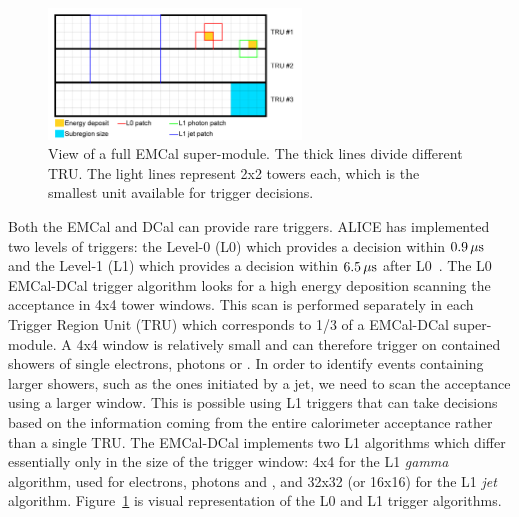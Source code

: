 \documentclass[12pt, a4paper, twoside, titlepage]{article}
\begin{document}
\begin{figure}[tb]
\begin{center}
\includegraphics[width=0.6\textwidth]{img/emcaltrigger}
 \caption{View of a full EMCal super-module. The thick lines divide different TRU. The light lines represent 2x2 towers each, which is the smallest unit
available for trigger decisions.} 
 \label{fig:emcaltrigger}
\end{center}
\end{figure}
Both the EMCal and DCal can provide rare triggers. ALICE has implemented two levels of triggers: the Level-0 (L0) which provides a decision within 
$0.9\,\rm \mu s$ and the Level-1 (L1) which provides a decision within $6.5\,\rm \mu s$ after L0~\cite{ALICE:2014b}. The L0 EMCal-DCal trigger algorithm looks for a high energy
deposition scanning the acceptance in 4x4 tower windows. This scan is performed separately in each Trigger Region Unit (TRU) which corresponds to 1/3 of a EMCal-DCal super-module.
A 4x4 window is relatively small and can therefore trigger on contained showers of single electrons, photons or \pizero.
In order to identify events containing larger showers, such as the ones initiated by a jet, we need to scan the acceptance using a larger window. This is possible using
L1 triggers that can take decisions based on the information coming from the entire calorimeter acceptance rather than a single TRU. The EMCal-DCal implements two L1 algorithms
which differ essentially only in the size of the trigger window: 4x4 for the L1 \emph{gamma} algorithm, used for electrons, photons and \pizero, and 32x32 (or 16x16) for the L1 \emph{jet} algorithm.
Figure~\ref{fig:emcaltrigger} is visual representation of the L0 and L1 trigger algorithms.
\end{document}
